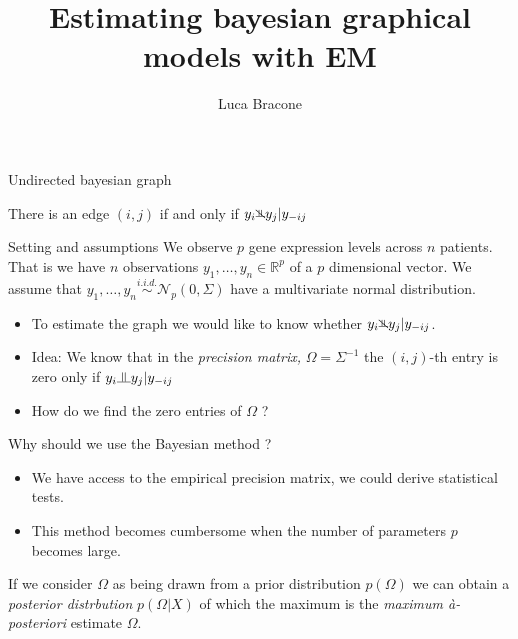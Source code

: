 \documentclass{beamer}
\title{Estimating bayesian graphical models with EM}
\author{Luca Bracone}
\newcommand{\indep}{\raisebox{0.05em}{\rotatebox[origin=c]{90}{$\models$}}}
\newcommand{\nindep}{{\rotatebox[origin=c]{90}{$\nvDash$}}}
\begin{document}
\begin{frame}{Undirected bayesian graph}
	\begin{center}
	\end{center}
	There is an edge $(i,j)$ if and only if $y_i \nindep y_j | y_{-ij}$
\end{frame}
\begin{frame}{Setting and assumptions}
	We observe $p$ gene expression levels across $n$ patients. That is we have
	$n$ observations $y_1, \dots, y_n \in \mathbb{R}^p$ of a $p$ dimensional
	vector. We assume that $y_1, \dots, y_n \stackrel{i.i.d.}{\sim}
		\mathcal{N}_p(0, \Sigma)$ have a multivariate normal distribution.
	\begin{itemize}
		\item To estimate the graph we would like to know whether $y_i \nindep
			      y_j | y_{-ij}$.
		\item Idea: We know that in the \emph{precision matrix,} $\Omega =
			      \Sigma^{-1}$ the $(i,j)$-th entry is zero only if $y_i \indep y_j |
			      y_{-ij}$
		\item How do we find the zero entries of $\Omega$ ?
	\end{itemize}
\end{frame}
\begin{frame}{Why should we use the Bayesian method ?}
	\begin{itemize}
		\item We have access to the empirical precision matrix, we could derive
		      statistical tests.
		\item This method becomes cumbersome when the number of parameters $p$
		      becomes large.
	\end{itemize}
	If we consider $\Omega$ as being drawn from a prior distribution
	$p(\Omega)$ we can obtain a \emph{posterior distrbution} $p(\Omega | X)$
	of which the maximum is the \emph{maximum à-posteriori} estimate
	$\Omega$.
\end{frame}
\end{document}
